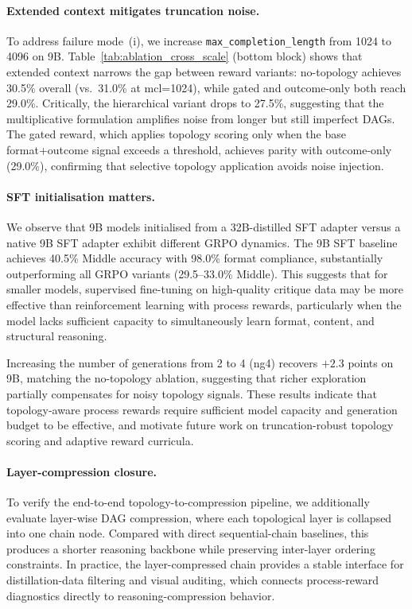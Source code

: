 \paragraph{Extended context mitigates truncation noise.}
To address failure mode~(i), we increase \texttt{max\_completion\_length} from 1024 to 4096 on 9B.
Table~\ref{tab:ablation_cross_scale} (bottom block) shows that extended context narrows the gap between reward variants: no-topology achieves 30.5\% overall (vs.\ 31.0\% at mcl=1024), while gated and outcome-only both reach 29.0\%.
Critically, the hierarchical variant drops to 27.5\%, suggesting that the multiplicative formulation amplifies noise from longer but still imperfect DAGs.
The gated reward, which applies topology scoring only when the base format+outcome signal exceeds a threshold, achieves parity with outcome-only (29.0\%), confirming that selective topology application avoids noise injection.

\paragraph{SFT initialisation matters.}
We observe that 9B models initialised from a 32B-distilled SFT adapter versus a native 9B SFT adapter exhibit different GRPO dynamics.
The 9B SFT baseline achieves 40.5\% Middle accuracy with 98.0\% format compliance, substantially outperforming all GRPO variants (29.5--33.0\% Middle).
This suggests that for smaller models, supervised fine-tuning on high-quality critique data may be more effective than reinforcement learning with process rewards, particularly when the model lacks sufficient capacity to simultaneously learn format, content, and structural reasoning.

Increasing the number of generations from 2 to 4 (ng4) recovers $+2.3$ points on 9B, matching the no-topology ablation, suggesting that richer exploration partially compensates for noisy topology signals.
These results indicate that topology-aware process rewards require sufficient model capacity and generation budget to be effective, and motivate future work on truncation-robust topology scoring and adaptive reward curricula.

\paragraph{Layer-compression closure.}
To verify the end-to-end topology-to-compression pipeline, we additionally evaluate layer-wise DAG compression, where each topological layer is collapsed into one chain node.
Compared with direct sequential-chain baselines, this produces a shorter reasoning backbone while preserving inter-layer ordering constraints.
In practice, the layer-compressed chain provides a stable interface for distillation-data filtering and visual auditing, which connects process-reward diagnostics directly to reasoning-compression behavior.

